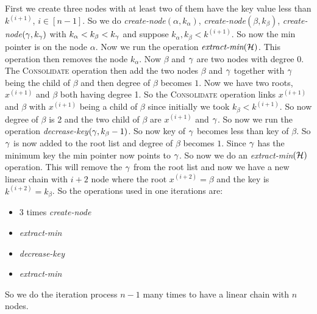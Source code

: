 \documentclass[a4paper, 11pt]{article}
\begin{document}
{\begin{itemize}
		First we create three nodes with at least two of them have the key value less than $k^{(i+1)}$, $i\in[n-1]$. So we do \textit{create-node}$(\alpha,k_{\alpha})$, \textit{create-node}$(\beta,k_{\beta})$, \textit{create-node}$(\gamma,k_{\gamma})$ with $k_{\alpha}<k_{\beta}<k_{\gamma}$ and  suppose $k_{\alpha},k_{\beta}<k^{(i+1)}$. So now the min pointer is on the node $\alpha$. Now we run the operation $\textit{extract-min}(\mathcal{H})$. This operation then removes the node $k_{\alpha}$. Now $\beta$ and $\gamma$ are two nodes with degree $0$. The \textsc{Consolidate} operation then add the two nodes $\beta$ and $\gamma$ together with $\gamma$ being the child of $\beta$ and then degree of $\beta$ becomes $1$. Now we have two roots, $x^{(i+1)}$ and $\beta$ both having degree 1. So the \textsc{Consolidate} operation links $x^{(i+1)}$ and $\beta$ with $x^{(i+1)}$ being a child of $\beta$ since initially we took $k_{\beta}<k^{(i+1)}$. So now degree of $\beta$ is 2 and the two child of $\beta $ are $x^{(i+1)}$ and $\gamma$. So now we run the operation \textit{decrease-key}$(\gamma,k_{\beta}-1)$. So now key of $\gamma$ becomes less than key of $\beta$. So $\gamma$ is now added to the root list  and degree of $\beta$ becomes $1$. Since $\gamma $ has the minimum key the min pointer now points to $\gamma$. So now we do an \textit{extract-min}$(\mathcal{H})$ operation. This will remove the $\gamma$ from the root list and now we have a new linear chain with $i+2$ node where the root $x^{(i+2)}=\beta$ and the key is $k^{(i+2)}=k_{\beta}$. So the operations used in one iterations are:
		\begin{itemize}
			\item $3$ times \textit{create-node}
			\item \textit{extract-min}
			\item \textit{decrease-key}
			\item \textit{extract-min}
		\end{itemize}
	\end{itemize}
So we do the iteration process $n-1$ many times to have a linear chain with $n$ nodes.  
}
\end{document}
